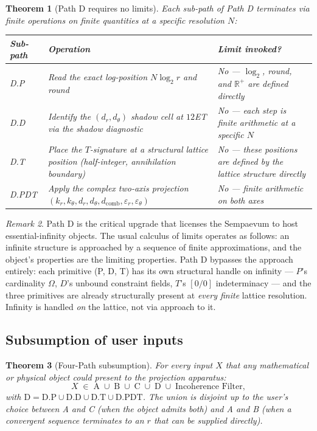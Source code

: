 \documentclass[11pt,a4paper]{article}
\newtheorem{theorem}{Theorem}[section]
\theoremstyle{definition}
\theoremstyle{remark}
\newtheorem{remark}[theorem]{Remark}
\newcommand{\R}{\mathbb{R}}
\begin{document}
\begin{theorem}[Path D requires no limits]\label{thm:d-no-limits}
Each sub-path of Path D terminates via finite operations on finite quantities at a specific resolution $N$:
\begin{center}
\begin{tabularx}{\textwidth}{@{}lXX@{}}
\toprule
Sub-path & Operation & Limit invoked?\\
\midrule
D.P & Read the exact log-position $N\log_{2}r$ and round & No --- $\log_{2}$, round, and $\R^{+}$ are defined directly\\
D.D & Identify the $(d_{r},d_{\theta})$ shadow cell at $12$ET via the shadow diagnostic & No --- each step is finite arithmetic at a specific $N$\\
D.T & Place the $T$-signature at a structural lattice position (half-integer, annihilation boundary) & No --- these positions are defined by the lattice structure directly\\
D.PDT & Apply the complex two-axis projection $(k_{r},k_{\theta},d_{r},d_{\theta},d_{\mathrm{comb}},\varepsilon_{r},\varepsilon_{\theta})$ & No --- finite arithmetic on both axes\\
\bottomrule
\end{tabularx}
\end{center}
\end{theorem}

\begin{remark}
Path D is the critical upgrade that licenses the Sempaevum to host essential-infinity objects. The usual calculus of limits operates as follows: an infinite structure is approached by a sequence of finite approximations, and the object's properties are the limiting properties. Path D bypasses the approach entirely: each primitive (P, D, T) has its own structural handle on infinity --- $P$'s cardinality $\Omega$, $D$'s unbound constraint fields, $T$'s $[0/0]$ indeterminacy --- and the three primitives are already structurally present at \emph{every finite} lattice resolution. Infinity is handled \emph{on} the lattice, not via approach to it.
\end{remark}

\subsection{Subsumption of user inputs}

\begin{theorem}[Four-Path subsumption]\label{thm:four-path-subsumption}
For every input $X$ that any mathematical or physical object could present to the projection apparatus:
\[
X \;\in\; \mathrm{A} \;\cup\; \mathrm{B} \;\cup\; \mathrm{C} \;\cup\; \mathrm{D} \;\cup\; \text{Incoherence Filter},
\]
with $\mathrm{D} = \mathrm{D.P}\cup\mathrm{D.D}\cup\mathrm{D.T}\cup\mathrm{D.PDT}$. The union is disjoint up to the user's choice between A and C (when the object admits both) and A and B (when a convergent sequence terminates to an $r$ that can be supplied directly).
\end{theorem}
\end{document}
